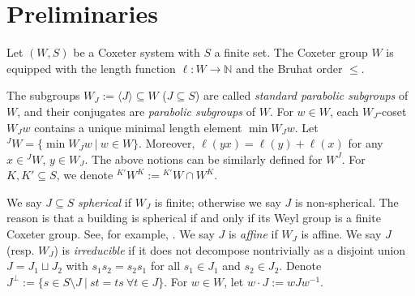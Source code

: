 \documentclass[a4paper, reqno, 14pt]{amsart}
\def\i{{^{-1}}}
\def\subset{\subseteq}
\def\NN{\mathbb{N}}
\theoremstyle{definition}
\theoremstyle{remark}
\numberwithin{equation}{section}
\numberwithin{thm}{section}
\begin{document}
\section{Preliminaries}

    Let $(W,S)$ be a Coxeter system with $S$ a finite set. The Coxeter group $W$ is equipped with the length function $\ell: W \to \NN$ and the Bruhat order $\le$. 
    
    The subgroups $W_J:=\langle J\rangle\subseteq W$ ($J\subseteq S$) are called \emph{standard parabolic subgroups} of $W$, and their conjugates are \emph{parabolic subgroups} of $W$. For $w\in W$, each $W_J$-coset $W_Jw$ contains a unique minimal length element $\min W_J w$. Let $^J W=\{\min W_J w\ |\ w\in W\}$. Moreover, $\ell( yx)=\ell(y)+\ell(x)$ for any $x\in {}^JW$, $y \in W_J$. The above notions can be similarly defined for $W^J$. For $K,K'\subset S$, we denote ${}^{K'}W^K:={}^{K'}W\cap W^K$.
    
        We say $J\subset S$ \emph{spherical} if $W_J$ is finite; otherwise we say $J$ is non-spherical. The reason is that a building is spherical if and only if its Weyl group is a finite Coxeter group. See, for example, \cite{abramenko2008buildings}. We say $J$ is \emph{affine} if $W_J$ is affine. We say $J$ (resp. $W_J$) is \emph{irreducible} if it does not decompose nontrivially as a disjoint union $J=J_1\sqcup J_2$ with $s_1s_2=s_2s_1$ for all $s_1\in J_1$ and $s_2\in J_2$. Denote $J^{\perp}:=\{s\in S\setminus J \ | \ st=ts \ \forall t\in J\}$. For $w\in W$, let $w\cdot J:=w J w \i$.
\end{document}
